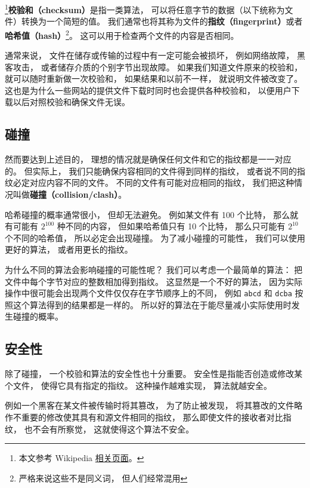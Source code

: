 

\footnote{本文参考 Wikipedia \href{https://en.wikipedia.org/wiki/Checksum}{相关页面}。}\textbf{校验和（checksum）}是指一类算法， 可以将任意字节的数据（以下统称为文件）转换为一个简短的值。 我们通常也将其称为文件的\textbf{指纹（fingerprint）}或者\textbf{哈希值（hash）}\footnote{严格来说这些不是同义词， 但人们经常混用}。 这可以用于检查两个文件的内容是否相同。 %

通常来说， 文件在储存或传输的过程中有一定可能会被损坏， 例如网络故障， 黑客攻击， 或者储存介质的个别字节出现故障。 如果我们知道文件原来的校验和， 就可以随时重新做一次校验和， 如果结果和以前不一样， 就说明文件被改变了。 这也是为什么一些网站的提供文件下载时同时也会提供各种校验和， 以便用户下载以后对照校验和确保文件无误。

\subsection{碰撞}
然而要达到上述目的， 理想的情况就是确保任何文件和它的指纹都是一一对应的。 但实际上， 我们只能确保内容相同的文件得到同样的指纹， 或者说不同的指纹必定对应内容不同的文件。 不同的文件有可能对应相同的指纹， 我们把这种情况叫做\textbf{碰撞（collision/clash）}。

哈希碰撞的概率通常很小， 但却无法避免。 例如某文件有 100 个比特， 那么就有可能有 $2^{100}$ 种不同的内容， 但如果哈希值只有 10 个比特， 那么只可能有 $2^{10}$ 个不同的哈希值， 所以必定会出现碰撞。 为了减小碰撞的可能性， 我们可以使用更好的算法， 或者用更长的指纹。

为什么不同的算法会影响碰撞的可能性呢？ 我们可以考虑一个最简单的算法： 把文件中每个字节对应的整数相加得到指纹。 这显然是一个不好的算法， 因为实际操作中很可能会出现两个文件仅仅存在字节顺序上的不同， 例如 \verb|abcd| 和 \verb|dcba| 按照这个算法得到的结果都是一样的。 所以好的算法在于能尽量减小实际使用时发生碰撞的概率。

\subsection{安全性}
除了碰撞， 一个校验和算法的安全性也十分重要。 安全性是指能否创造或修改某个文件， 使得它具有指定的指纹。 这种操作越难实现， 算法就越安全。

例如一个黑客在某文件被传输时将其篡改， 为了防止被发现， 将其篡改的文件略作不重要的修改使其具有和源文件相同的指纹， 那么即使文件的接收者对比指纹， 也不会有所察觉， 这就使得这个算法不安全。

